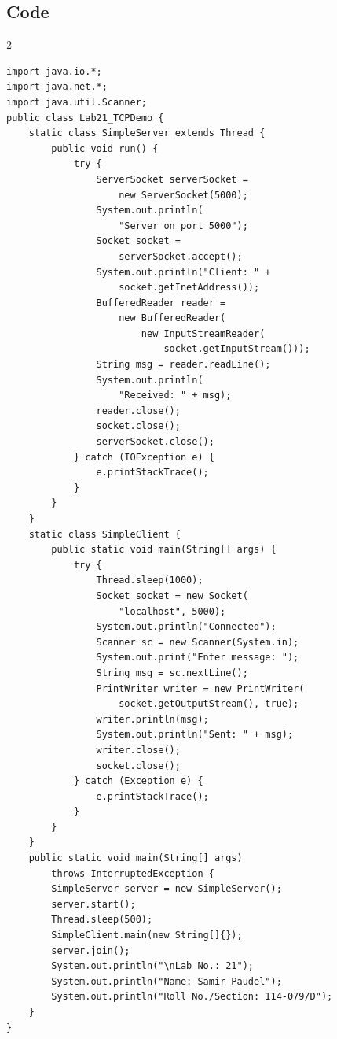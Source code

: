 \documentclass[10pt,a4paper]{article}
\begin{document}
\subsection*{Code}
\begin{multicols}{2}
\begin{lstlisting}
import java.io.*;
import java.net.*;
import java.util.Scanner;
public class Lab21_TCPDemo {
    static class SimpleServer extends Thread {
        public void run() {
            try {
                ServerSocket serverSocket = 
                    new ServerSocket(5000);
                System.out.println(
                    "Server on port 5000");
                Socket socket = 
                    serverSocket.accept();
                System.out.println("Client: " + 
                    socket.getInetAddress());
                BufferedReader reader = 
                    new BufferedReader(
                        new InputStreamReader(
                            socket.getInputStream()));
                String msg = reader.readLine();
                System.out.println(
                    "Received: " + msg);
                reader.close();
                socket.close();
                serverSocket.close();
            } catch (IOException e) {
                e.printStackTrace();
            }
        }
    }
    static class SimpleClient {
        public static void main(String[] args) {
            try {
                Thread.sleep(1000);
                Socket socket = new Socket(
                    "localhost", 5000);
                System.out.println("Connected");
                Scanner sc = new Scanner(System.in);
                System.out.print("Enter message: ");
                String msg = sc.nextLine();
                PrintWriter writer = new PrintWriter(
                    socket.getOutputStream(), true);
                writer.println(msg);
                System.out.println("Sent: " + msg);
                writer.close();
                socket.close();
            } catch (Exception e) {
                e.printStackTrace();
            }
        }
    }
    public static void main(String[] args) 
        throws InterruptedException {
        SimpleServer server = new SimpleServer();
        server.start();
        Thread.sleep(500);
        SimpleClient.main(new String[]{});
        server.join();
        System.out.println("\nLab No.: 21");
        System.out.println("Name: Samir Paudel");
        System.out.println("Roll No./Section: 114-079/D");
    }
}
\end{lstlisting}
\end{multicols}
\end{document}
